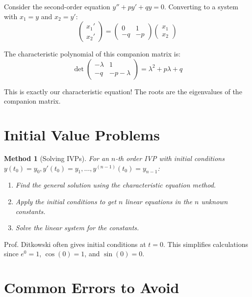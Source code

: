 \documentclass[12pt]{article}
\newtheorem{method}{Method}
\begin{document}
\begin{insight}
Consider the second-order equation $y'' + py' + qy = 0$. Converting to a system with $x_1 = y$ and $x_2 = y'$:
$$\begin{pmatrix} x_1' \\ x_2' \end{pmatrix} = \begin{pmatrix} 0 & 1 \\ -q & -p \end{pmatrix} \begin{pmatrix} x_1 \\ x_2 \end{pmatrix}$$

The characteristic polynomial of this companion matrix is:
$$\det\begin{pmatrix} -\lambda & 1 \\ -q & -p-\lambda \end{pmatrix} = \lambda^2 + p\lambda + q$$

This is exactly our characteristic equation! The roots are the eigenvalues of the companion matrix.
\end{insight}

\section{Initial Value Problems}

\begin{method}[Solving IVPs]
For an $n$-th order IVP with initial conditions $y(t_0) = y_0, y'(t_0) = y_1, \ldots, y^{(n-1)}(t_0) = y_{n-1}$:
\begin{enumerate}
    \item Find the general solution using the characteristic equation method.
    \item Apply the initial conditions to get $n$ linear equations in the $n$ unknown constants.
    \item Solve the linear system for the constants.
\end{enumerate}
\end{method}

\begin{examtip}
Prof. Ditkowski often gives initial conditions at $t = 0$. This simplifies calculations since $e^0 = 1$, $\cos(0) = 1$, and $\sin(0) = 0$.
\end{examtip}

\section{Common Errors to Avoid}
\end{document}
